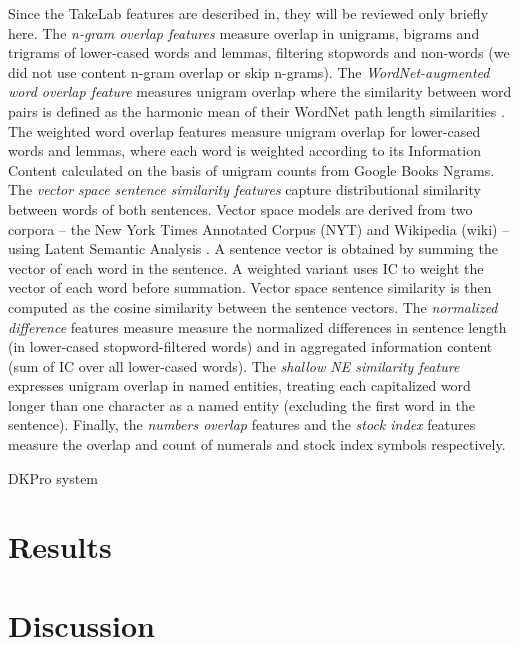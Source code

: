 \documentclass[11pt,letterpaper]{article}
\begin{document}
Since the TakeLab features are described in\cite{vsaric2012takelab},
they will be reviewed only briefly here. The\emph{ n-gram overlap
  features} measure overlap in unigrams, bigrams and trigrams of
lower-cased words and lemmas, filtering stopwords and non-words (we
did not use content n-gram overlap or skip n-grams). The\emph{
  WordNet-augmented word overlap feature} measures unigram overlap
where the similarity between word pairs is defined as the harmonic
mean of their WordNet path length similarities \cite{}. The weighted
word overlap features measure unigram overlap for lower-cased words
and lemmas, where each word is weighted according to its Information
Content calculated on the basis of unigram counts from Google Books
Ngrams. The \emph{vector space sentence similarity features} capture
distributional similarity between words of both sentences. Vector
space models are derived from two corpora -- the New York Times
Annotated Corpus (NYT) and Wikipedia (wiki) -- using Latent Semantic
Analysis \cite{DeerwesterDumaisFurnas:1990}. A sentence vector is
obtained by summing the vector of each word in the sentence.  A
weighted variant uses IC to weight the vector of each word before
summation. Vector space sentence similarity is then computed as the
cosine similarity between the sentence vectors. The \emph{normalized
  difference} features measure measure the normalized differences in
sentence length (in lower-cased stopword-filtered words) and in
aggregated information content (sum of IC over all lower-cased
words). The \emph{shallow NE similarity feature} expresses unigram
overlap in named entities, treating each capitalized word longer than
one character as a named entity (excluding the first word in the
sentence). Finally, the\emph{ numbers overlap} features and the
\emph{stock index} features measure the overlap and count of numerals
and stock index symbols respectively. 

DKPro system \cite{bar2012ukp}











\section{Results}


\section{Discussion}
\end{document}
